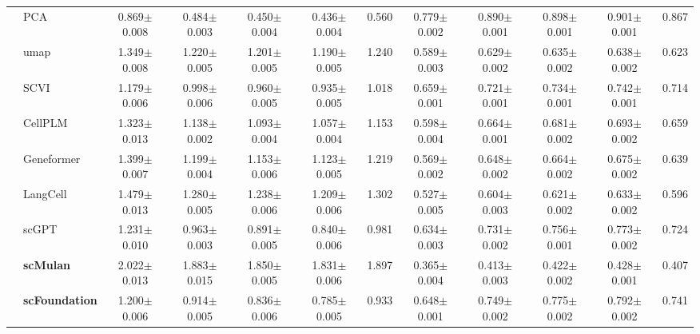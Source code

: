 \begin{table}[htbp]
\begin{tabular}{cl|ccccc|ccccc}
    & PCA      & \cellcolor{gray!25}0.869$\pm$0.008 & \cellcolor{gray!25}0.484$\pm$0.003 & \cellcolor{gray!25}0.450$\pm$0.004 & \cellcolor{gray!25}0.436$\pm$0.004 & \cellcolor{gray!25}0.560      & \cellcolor{gray!25}0.779$\pm$0.002 & \cellcolor{gray!25}0.890$\pm$0.001 & \cellcolor{gray!25}0.898$\pm$0.001 & \cellcolor{gray!25}0.901$\pm$0.001 & \cellcolor{gray!25}0.867 \\
    & umap      & 1.349$\pm$0.008 & 1.220$\pm$0.005 & 1.201$\pm$0.005 & 1.190$\pm$0.005 & 1.240      & 0.589$\pm$0.003 & 0.629$\pm$0.002 & 0.635$\pm$0.002 & 0.638$\pm$0.002 & 0.623 \\
    & SCVI      & 1.179$\pm$0.006 & 0.998$\pm$0.006 & 0.960$\pm$0.005 & 0.935$\pm$0.005 & 1.018      & 0.659$\pm$0.001 & 0.721$\pm$0.001 & 0.734$\pm$0.001 & 0.742$\pm$0.001 & 0.714 \\
    & CellPLM      & 1.323$\pm$0.013 & 1.138$\pm$0.002 & 1.093$\pm$0.004 & 1.057$\pm$0.004 & 1.153      & 0.598$\pm$0.004 & 0.664$\pm$0.001 & 0.681$\pm$0.002 & 0.693$\pm$0.002 & 0.659 \\
    & Geneformer      & 1.399$\pm$0.007 & 1.199$\pm$0.004 & 1.153$\pm$0.006 & 1.123$\pm$0.005 & 1.219      & 0.569$\pm$0.002 & 0.648$\pm$0.002 & 0.664$\pm$0.002 & 0.675$\pm$0.002 & 0.639 \\
    & LangCell      & 1.479$\pm$0.013 & 1.280$\pm$0.005 & 1.238$\pm$0.006 & 1.209$\pm$0.006 & 1.302      & 0.527$\pm$0.005 & 0.604$\pm$0.003 & 0.621$\pm$0.002 & 0.633$\pm$0.002 & 0.596 \\
    & scGPT      & 1.231$\pm$0.010 & 0.963$\pm$0.003 & 0.891$\pm$0.005 & 0.840$\pm$0.006 & 0.981      & 0.634$\pm$0.003 & 0.731$\pm$0.002 & 0.756$\pm$0.001 & 0.773$\pm$0.002 & 0.724 \\
    & \cellcolor{gray!25}\textbf{scMulan}      & 2.022$\pm$0.013 & 1.883$\pm$0.015 & 1.850$\pm$0.005 & 1.831$\pm$0.006 & 1.897      & 0.365$\pm$0.004 & 0.413$\pm$0.003 & 0.422$\pm$0.002 & 0.428$\pm$0.001 & 0.407 \\
    & \cellcolor{gray!25}\textbf{scFoundation}      & 1.200$\pm$0.006 & 0.914$\pm$0.005 & 0.836$\pm$0.006 & 0.785$\pm$0.005 & 0.933      & 0.648$\pm$0.001 & 0.749$\pm$0.002 & 0.775$\pm$0.002 & 0.792$\pm$0.002 & 0.741 \\
    \midrule

    \end{tabular}
  \end{table}

